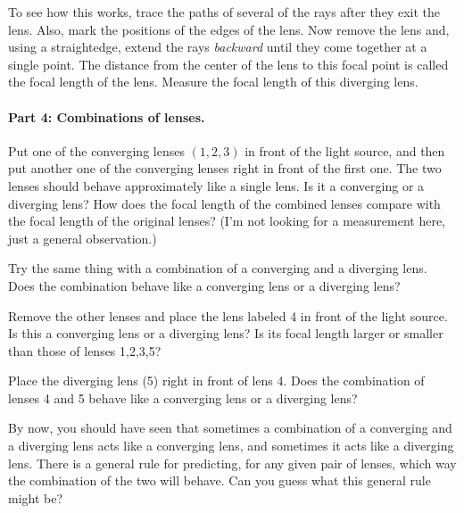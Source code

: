 To see how this works, trace the paths of several of the rays 
after they exit the lens.  Also, mark the positions of the edges
of the lens.  Now remove the lens and, using a straightedge, extend
the rays {\it backward} until they come together at a single point.  
The distance from the center of the lens to this focal point is
called the focal length of the lens.  Measure the focal length
of this diverging lens.

\answerspace{1.0in}

\paragraph{Part 4: Combinations of lenses.}
Put one of the converging lenses $(1,2,3)$ in front of the light source, and
then put another one of the converging lenses right in front of the first
one.  The two lenses should behave approximately like a single lens.
Is it a converging or a diverging lens?  How does the focal length of
the combined lenses compare with the focal length of the original
lenses?  (I'm not looking for a measurement here, just a general
observation.)

\answerspace{1.4in}

\pagebreak[2]
Try the same thing with a combination of a converging and a diverging
lens.  Does the combination behave like a converging lens or a diverging
lens?  

\answerspace{1.4in}

Remove the other lenses and place the lens labeled 4 in front
of the light source.  Is this a converging lens or a diverging lens?
Is its focal length larger or smaller than those of lenses 1,2,3,5?

\answerspace{1.4in}

Place the diverging lens (5) right in front of lens 4.  Does the combination
of lenses 4 and 5 behave like a converging lens or a diverging lens?

\answerspace{1.4in}

By now, you should have seen that sometimes a combination of a converging
and a diverging lens acts like a converging lens, and sometimes it
acts like a diverging lens.  There is a general rule for predicting,
for any given pair of lenses, which way the combination of the two
will behave.  Can you guess what this general rule might be?

\answerspace{0.7in}

